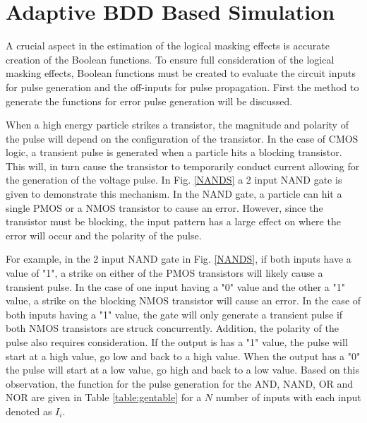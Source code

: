 \section{Adaptive BDD Based Simulation} 

A crucial aspect in the estimation of the logical masking effects is accurate creation of the Boolean functions. To ensure full consideration of the logical masking effects, Boolean functions must be created to evaluate the circuit inputs for pulse generation and the off-inputs for pulse propagation. First the method to generate the functions for error pulse generation will be discussed. 

When a high energy particle strikes a transistor, the magnitude and polarity of the pulse will depend on the configuration of the transistor. In the case of CMOS logic, a transient pulse is generated when a particle hits a blocking transistor. This will, in turn cause the transistor to temporarily conduct current allowing for the generation of the voltage pulse. In Fig. \ref{NANDS} a 2 input NAND gate is given to demonstrate this mechanism. In the NAND gate, a particle can hit a single PMOS or a NMOS transistor to cause an error. However, since the transistor must be blocking, the input pattern has a large effect on where the error will occur and the polarity of the pulse. 

For example, in the 2 input NAND gate in Fig. \ref{NANDS}, if both inputs have a value of "1", a strike on either of the PMOS transistors will likely cause a transient pulse. In the case of one input having a "0" value and the other a "1" value,  a strike on the blocking NMOS transistor will cause an error. In the case of both inputs having a "1" value, the gate will only generate a transient pulse if both NMOS transistors are struck concurrently. Addition, the polarity of the pulse also requires consideration. If the output is has a "1" value, the pulse will start at a high value, go low and back to a high value. When the output has a "0" the pulse will start at a low value, go high and back to a low value. Based on this observation, the function for the pulse generation for the AND, NAND, OR and NOR are given in Table \ref{table:gentable} for a $N$ number of inputs with each input denoted as $I_i$.

